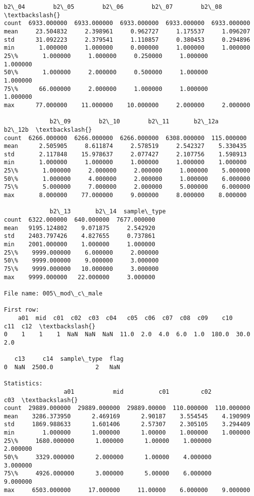 \documentclass[11pt]{article}
\begin{document}
\begin{Verbatim}[commandchars=\\\{\}]
             b2\_04        b2\_05        b2\_06        b2\_07        b2\_08  \textbackslash{}
count  6933.000000  6933.000000  6933.000000  6933.000000  6933.000000   
mean     23.504832     2.398961     0.962727     1.175537     1.096207   
std      31.092223     2.379541     1.110857     0.380453     0.294896   
min       1.000000     1.000000     0.000000     1.000000     1.000000   
25\%       1.000000     1.000000     0.250000     1.000000     1.000000   
50\%       1.000000     2.000000     0.500000     1.000000     1.000000   
75\%      66.000000     2.000000     1.000000     1.000000     1.000000   
max      77.000000    11.000000    10.000000     2.000000     2.000000   

             b2\_09        b2\_10        b2\_11       b2\_12a      b2\_12b  \textbackslash{}
count  6266.000000  6266.000000  6266.000000  6308.000000  115.000000   
mean      2.505905     8.611874     2.578519     2.542327    5.330435   
std       2.117848    15.978637     2.077427     2.107756    1.598913   
min       1.000000     1.000000     1.000000     1.000000    1.000000   
25\%       1.000000     2.000000     2.000000     1.000000    5.000000   
50\%       1.000000     4.000000     2.000000     1.000000    6.000000   
75\%       5.000000     7.000000     2.000000     5.000000    6.000000   
max       8.000000    77.000000     9.000000     8.000000    8.000000   

             b2\_13       b2\_14  sample\_type  
count  6322.000000  640.000000  7677.000000  
mean   9195.124802    9.071875     2.542920  
std    2403.797426    4.827655     0.737861  
min    2001.000000    1.000000     1.000000  
25\%    9999.000000    6.000000     2.000000  
50\%    9999.000000    9.000000     3.000000  
75\%    9999.000000   10.000000     3.000000  
max    9999.000000   22.000000     3.000000  

File name: 005\_mod\_c\_male

First row: 
    a01  mid  c01  c02  c03  c04   c05  c06  c07  c08  c09    c10   c11  c12  \textbackslash{}
0    1    1    1  NaN  NaN  NaN  11.0  2.0  4.0  6.0  1.0  180.0  30.0  2.0   

   c13     c14  sample\_type  flag  
0  NaN  2500.0            2   NaN  

Statistics: 
                 a01           mid          c01         c02         c03  \textbackslash{}
count  29889.000000  29889.000000  29889.00000  110.000000  110.000000   
mean    3286.373950      2.469169      2.90187    3.554545    4.190909   
std     1869.988633      1.601406      2.57307    2.305105    3.294409   
min        1.000000      1.000000      1.00000    1.000000    1.000000   
25\%     1680.000000      1.000000      1.00000    1.000000    2.000000   
50\%     3329.000000      2.000000      1.00000    4.000000    3.000000   
75\%     4926.000000      3.000000      5.00000    6.000000    9.000000   
max     6503.000000     17.000000     11.00000    6.000000    9.000000   


\end{Verbatim}
\end{document}
